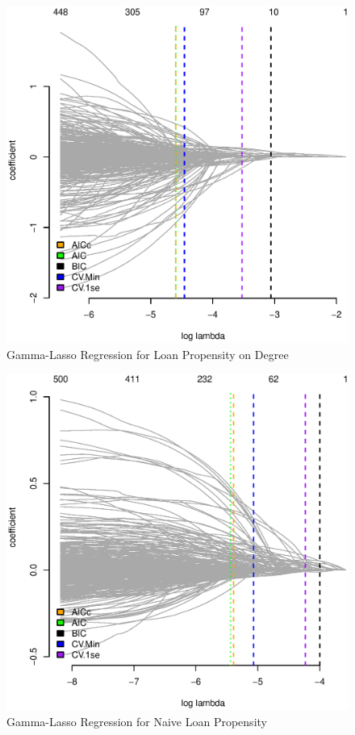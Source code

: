 \documentclass[11pt, fleqn]{article}
\begin{document}
\begin{figure}[!htb]
  \centering
  \includegraphics[scale=.5]{treat_aic.eps}
  \caption{Gamma-Lasso Regression for Loan Propensity on Degree}
  \label{fig:causal_aic}
\end{figure}



\begin{figure}[!htb]
  \centering
  \includegraphics[scale=.5]{naive_aic.eps}
  \caption{Gamma-Lasso Regression for Naive Loan Propensity}
  \label{fig:naive_aic}
\end{figure}


\end{document}
